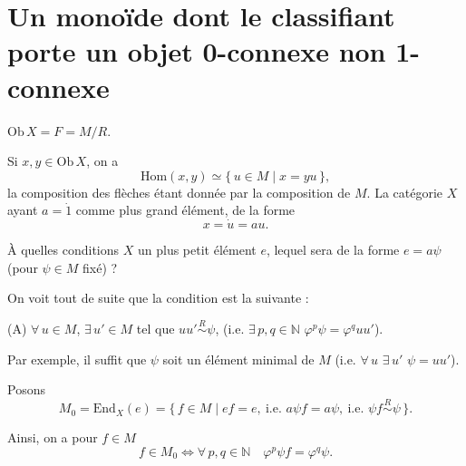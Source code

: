 \documentclass[11pt,a4paper]{article}
\begin{document}
\section*{Un monoïde dont le classifiant porte un objet 0-connexe non 1-connexe}




$\mathrm{Ob}\,X = F = M/R$.

Si $x, y \in \mathrm{Ob}\,X$, on a
\[
  \mathrm{Hom}(x,y) \simeq \{\, u \in M \mid x = yu \,\},
\]
la composition des flèches étant donnée par la composition de $M$. La catégorie
$X$ ayant $a = \dot{1}$ comme plus grand élément, 
\ill{} de la forme
\[
  x = \dot{u} = au .
\]


À quelles conditions $X$  un plus petit élément $e$, lequel
sera de la forme $e = a\psi$ (pour $\psi \in M$ fixé) ?



On voit tout de suite que la condition est la suivante :

(A) $\forall\, u \in M$, $\exists\, u' \in M$ tel que $uu' \overset{R}{\sim} \psi$,
(i.e. $\exists\, p,q \in \mathbb{N}$ \ill{} $\varphi^{p}\psi = \varphi^{q}uu'$).

Par exemple, il suffit que $\psi$ soit un élément minimal de $M$
(i.e. $\forall\, u$ $\exists\, u'$ \ill{} $\psi = uu'$).


Posons
\[
  M_0 = \mathrm{End}_X(e) = \{\, f \in M \mid ef = e,\ \text{i.e. } a\psi f = a\psi,
  \ \text{i.e. } \psi f \overset{R}{\sim} \psi \,\}.
\]

Ainsi, on a pour $f \in M$
\[
  f \in M_0 \iff \forall\, p,q \in \mathbb{N} \quad \varphi^{p}\psi f = \varphi^{q}\psi .
\]
\end{document}
